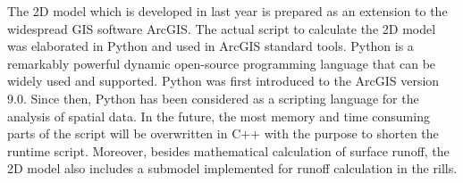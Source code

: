  


The 2D model which is developed in last year is prepared as an extension to the widespread GIS software ArcGIS. The actual script to calculate the 2D model was elaborated in Python and used in ArcGIS standard tools. Python is a remarkably powerful dynamic open-source programming language that can be widely used and supported. Python was first introduced to the ArcGIS version 9.0. Since then, Python has been considered as a scripting language for the analysis of spatial data. In the future, the most memory and time consuming parts of the script will be overwritten in C++ with the purpose to shorten the runtime script.
Moreover, besides mathematical calculation of surface runoff, the 2D model also includes a submodel implemented for runoff calculation in the rills.


